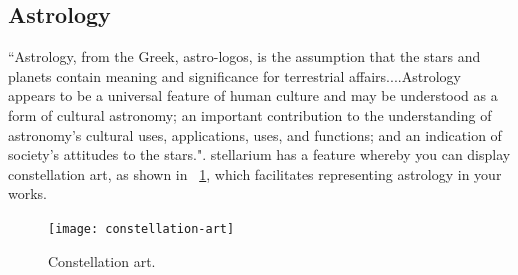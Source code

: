 \subsection{Astrology}
``Astrology, from the Greek, astro-logos, is the assumption that the stars and planets
contain meaning and significance for terrestrial affairs....Astrology appears to
be a universal feature of human culture and may be understood as a form of cultural
astronomy; an important contribution to the understanding of astronomy’s cultural
uses, applications, uses, and functions; and an indication of society’s attitudes to the
stars."\cite[p.~104]{Campion2015}. stellarium has a feature whereby you can display constellation art, as shown in ~\ref{fig_constellation-art}, which facilitates representing astrology in your works.

\begin{figure}[ht]
	\centerline{\texttt{[image: constellation-art]}}
	\caption{\label{fig_constellation-art}{Constellation art.}}
\end{figure}


	
